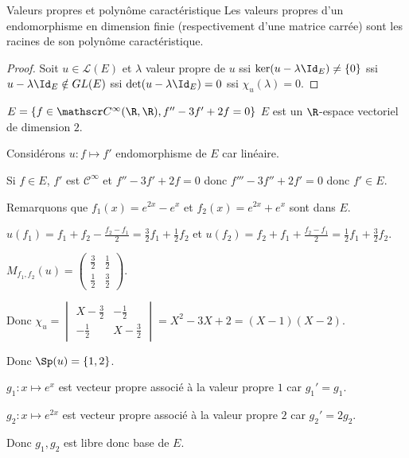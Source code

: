 \begin{theoreme}{Valeurs propres et polynôme caractéristique}{}
    Les valeurs propres d'un endomorphisme en dimension finie (respectivement d'une matrice carrée) 
    sont les racines de son polynôme caractéristique.
\end{theoreme}

\begin{proof}
    Soit $u \in \mathscr L(E)$ et $\lambda$ valeur propre de $u$ 
    ssi $\ker(u - \lambda \Id_E) \neq \{0\}$
    ssi $u - \lambda \Id_E \notin GL(E)$
    ssi $\det(u - \lambda \Id_E) = 0$
    ssi $\chi_u(\lambda) = 0$.
\end{proof}

\begin{exemple}
    $E = \{f \in \mathscr C^\infty(\R, \R), f'' - 3 f' + 2f = 0\}$ $E$ est un 
    $\R$-espace vectoriel de dimension $2$.

    Considérons $u : f \mapsto f'$ endomorphisme de $E$ car linéaire. 

    Si $f \in E$, $f'$ est $\mathscr C^\infty$ et $f'' - 3 f' + 2f = 0$ donc $f''' - 3 f'' + 2 f' = 0$ donc $f' \in E$.

    Remarquons que $f_1(x) = e^{2x} - e^x$ et $f_2(x) = e^{2x} + e^x$ sont dans $E$. 

    $u(f_1) = f_1 + f_2 - \frac{f_2 - f_1}{2} = \frac{3}{2} f_1 + \frac{1}{2} f_2$ et
    $u(f_2) = f_2 + f_1 + \frac{f_2 - f_1}{2} = \frac{1}{2} f_1 + \frac{3}{2} f_2$.

    $M_{f_1, f_2}(u) = \begin{pmatrix}
        \frac{3}{2} & \frac{1}{2} \\
        \frac{1}{2} & \frac{3}{2}
    \end{pmatrix}$.

    Donc $\chi_u = \begin{vmatrix}
        X - \frac{3}{2} & -\frac{1}{2} \\
        -\frac{1}{2} & X - \frac{3}{2}
    \end{vmatrix} = X^2 - 3X + 2 = (X - 1)(X - 2)$.

    Donc $\Sp(u) = \{1, 2\}$.

    $g_1 : x \mapsto e^x$ est vecteur propre associé à la valeur propre $1$ car $g_1' = g_1$.

    $g_2 : x \mapsto e^{2x}$ est vecteur propre associé à la valeur propre $2$ car $g_2' = 2 g_2$.

    Donc $g_1, g_2$ est libre donc base de $E$.
\end{exemple}

